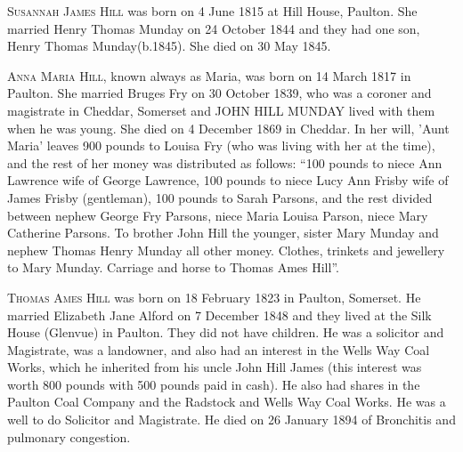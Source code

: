 \textsc{Susannah James Hill} was born on 4 June 1815 at Hill House, Paulton. She married Henry Thomas Munday on 24 October 1844 and they had one son, Henry Thomas Munday(b.1845). She died on 30 May 1845.

\textsc{Anna Maria Hill}, known always as Maria, was born on 14 March 1817 in Paulton. She married Bruges Fry on 30 October 1839, who was a coroner and magistrate in Cheddar, Somerset and \uppercase{John Hill Munday} lived with them when he was young. She died on 4 December 1869 in Cheddar.  In her will, 'Aunt Maria' leaves 900 pounds to Louisa Fry (who was living with her at the time), and the rest of her money was distributed as follows: ``100 pounds to niece Ann Lawrence wife of George Lawrence, 100 pounds to niece Lucy Ann Frisby wife of James Frisby (gentleman), 100 pounds to Sarah Parsons, and the rest  divided between nephew George Fry Parsons, niece Maria Louisa Parson, niece Mary Catherine Parsons. To brother John Hill the younger, sister Mary Munday and nephew Thomas Henry Munday all other money. Clothes, trinkets and jewellery to Mary Munday. Carriage and horse to Thomas Ames Hill''.

\textsc{Thomas Ames Hill} was born on 18 February 1823 in Paulton, Somerset.  He married Elizabeth Jane Alford on 7 December 1848 and they lived at the Silk House (Glenvue) in Paulton. They did not have children. He was a solicitor and Magistrate, was a landowner, and also had an interest in the Wells Way Coal Works, which he inherited from his uncle John Hill James (this interest was worth 800 pounds with 500 pounds paid in cash). He also had shares in the Paulton Coal Company and the Radstock and Wells Way Coal Works.  He was a well to do Solicitor and Magistrate.  He died on 26 January 1894 of Bronchitis and pulmonary congestion.
















